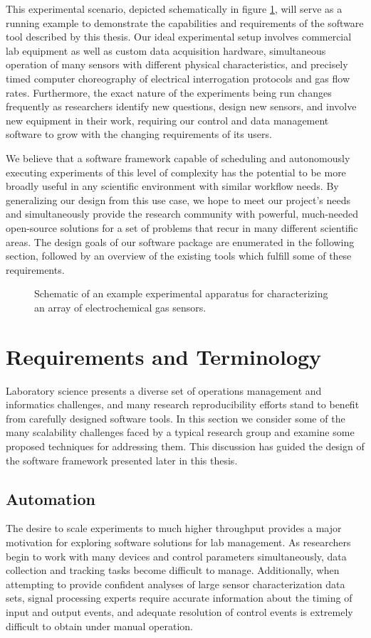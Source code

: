 \documentclass[../thesis]{subfiles}
\begin{document}
This experimental scenario, depicted schematically in figure
\ref{fig:EchemUseCase},
will serve as a running example to demonstrate the
capabilities and requirements of the software tool described by this
thesis. Our ideal experimental setup involves commercial lab equipment
as well as custom data acquisition hardware, simultaneous operation of
many sensors with different physical characteristics, and precisely
timed computer choreography of electrical interrogation protocols and
gas flow rates. Furthermore, the exact nature of the experiments being
run changes frequently as researchers identify new questions, design
new sensors, and involve new equipment in their work,
requiring our control and data management software to grow with the
changing requirements of its users.

We believe that a software framework capable of scheduling and
autonomously executing experiments of this level of complexity has the
potential to be more broadly useful in any scientific environment with
similar workflow needs. By generalizing our design from this use case,
we hope to meet our project's needs and simultaneously provide the
research community with powerful, much-needed open-source solutions
for a set of problems that recur in many different scientific areas.
The design goals of our software package are enumerated in the
following section, followed by an overview of the existing tools which
fulfill some of these requirements.

\begin{figure}
  \caption{
    Schematic of an example experimental apparatus for
    characterizing an array of electrochemical gas sensors.
    \label{fig:EchemUseCase}
  }
\end{figure}



\section{Requirements and Terminology}
Laboratory science presents a diverse set of operations management and
informatics challenges, and many research reproducibility efforts stand to
benefit from carefully designed software tools. In this section we
consider some of the many scalability challenges faced by a typical
research group and examine some proposed techniques for addressing
them. This discussion has guided the design of the software framework
presented later in this thesis.

\subsection{Automation}
The desire to scale experiments to much higher throughput provides a
major motivation for exploring software solutions for lab management.
As researchers begin to work with many devices and control
parameters simultaneously, data collection and tracking tasks become
difficult to manage. Additionally, when attempting to provide
confident analyses of large sensor characterization data sets, signal
processing experts require accurate information about the timing of
input and output events, and adequate resolution of control events is
extremely difficult to obtain under manual operation.
\end{document}

